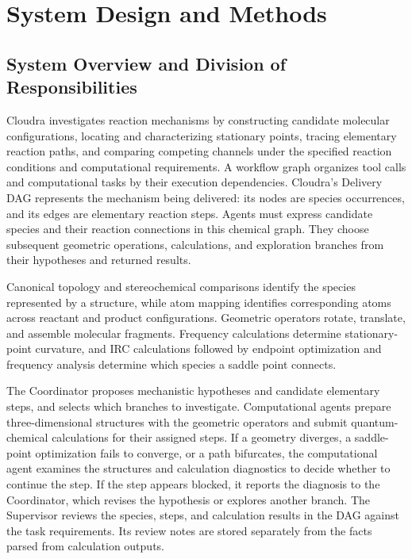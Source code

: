 \section{System Design and Methods}

\subsection{System Overview and Division of Responsibilities}
Cloudra investigates reaction mechanisms by constructing candidate molecular configurations, locating and characterizing stationary points, tracing elementary reaction paths, and comparing competing channels under the specified reaction conditions and computational requirements. A workflow graph organizes tool calls and computational tasks by their execution dependencies. Cloudra's Delivery DAG represents the mechanism being delivered: its nodes are species occurrences, and its edges are elementary reaction steps. Agents must express candidate species and their reaction connections in this chemical graph. They choose subsequent geometric operations, calculations, and exploration branches from their hypotheses and returned results.

Canonical topology and stereochemical comparisons identify the species represented by a structure, while atom mapping identifies corresponding atoms across reactant and product configurations. Geometric operators rotate, translate, and assemble molecular fragments. Frequency calculations determine stationary-point curvature, and IRC calculations followed by endpoint optimization and frequency analysis determine which species a saddle point connects.

The Coordinator proposes mechanistic hypotheses and candidate elementary steps, and selects which branches to investigate. Computational agents prepare three-dimensional structures with the geometric operators and submit quantum-chemical calculations for their assigned steps. If a geometry diverges, a saddle-point optimization fails to converge, or a path bifurcates, the computational agent examines the structures and calculation diagnostics to decide whether to continue the step. If the step appears blocked, it reports the diagnosis to the Coordinator, which revises the hypothesis or explores another branch. The Supervisor reviews the species, steps, and calculation results in the DAG against the task requirements. Its review notes are stored separately from the facts parsed from calculation outputs.

